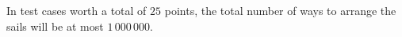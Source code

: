 In test cases worth a total of $25$ points, the total number of ways to arrange the sails will be at most $1\,000\,000$.